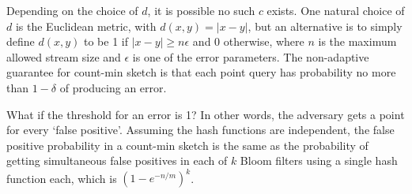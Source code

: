 
Depending on the choice of $d$, it is possible no such $c$ exists. One natural choice of $d$ is the Euclidean metric, with $d(x,y) = |x-y|$, but an alternative is to simply define $d(x,y)$ to be 1 if $|x-y| \ge n\epsilon$ and 0 otherwise, where $n$ is the maximum allowed stream size and $\epsilon$ is one of the error parameters. The non-adaptive guarantee for count-min sketch is that each point query has probability no more than $1-\delta$ of producing an error.

What if the threshold for an error is 1? In other words, the adversary gets a point for every `false positive'. Assuming the hash functions are independent, the false positive probability in a count-min sketch is the same as the probability of getting simultaneous false positives in each of $k$ Bloom filters using a single hash function each, which is $\left(1-e^{-n/m}\right)^k$.




